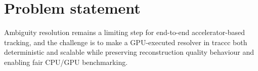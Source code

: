 \section{Problem statement}

Ambiguity resolution remains a limiting step for end-to-end accelerator-based tracking, and the challenge is to make a GPU-executed resolver in traccc both deterministic and scalable while preserving reconstruction quality behaviour and enabling fair CPU/GPU benchmarking.
